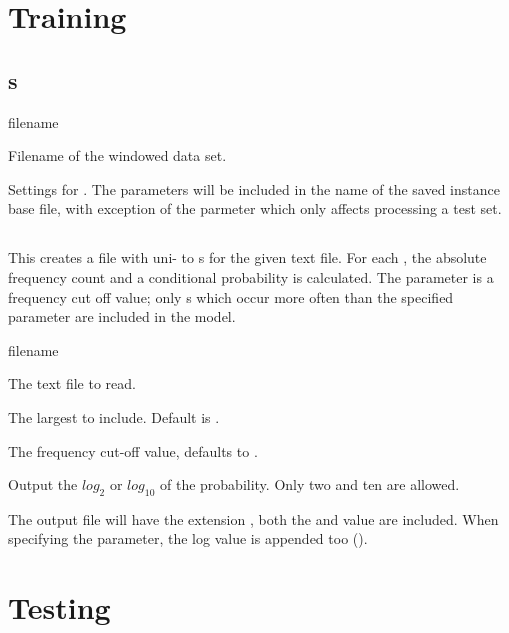 \documentclass[a4paper,10pt,twoside]{report}
\begin{document}
\section{Training}

\subsection{s}

\begin{varlist}{filename}
\item[filename] Filename of the windowed data set.
\item[timbl] Settings for \Timbl{}. The parameters will be included in
  the name of the saved instance base file, with exception of the
   parmeter which only affects processing a test set.
\end{varlist}

\subsection{}

This creates a file with uni- to \ngram{}s for the given text
file. For each \ngram{}, the absolute frequency count and a
conditional probability is calculated. The  parameter is a
frequency cut off value; only \ngram{}s which occur more often than
the specified  parameter are included in the model.

\begin{varlist}{filename}
\item[filename] The text file to read.
\item[n] The largest \ngram{} to include. Default is .
\item[fco] The frequency cut-off value, defaults to .
\item[log] Output the $log_2$ or $log_{10}$ of the probability. Only
  two and ten are allowed.
\end{varlist}

The output file will have the extension , both the
 and  value are included. When specifying the
 parameter, the log value is appended too ().

\section{Testing}

\subsection{}
\end{document}
